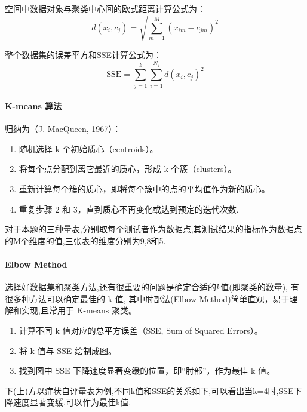 \documentclass[withoutpreface,bwprint]{cumcmthesis} %
\begin{document}
空间中数据对象与聚类中心间的欧式距离计算公式为：
\begin{equation}
    d(x_i, c_j) = \sqrt{\sum_{m=1}^M (x_{im} - c_{jm})^2}
\end{equation}

整个数据集的误差平方和SSE计算公式为：
\begin{equation}
\text{SSE} = \sum_{j=1}^k \sum_{i=1}^{N_j} d(x_i, c_j)^2
\end{equation}
    

\paragraph*{K-means 算法}归纳为（J. MacQueen, 1967）\cite{k-means}：
\begin{enumerate}
    \item 随机选择 k 个初始质心（centroids）。
    
    \item 将每个点分配到离它最近的质心，形成 k 个簇（clusters）。
    
    \item 重新计算每个簇的质心，即将每个簇中的点的平均值作为新的质心。
    
    \item 重复步骤 2 和 3，直到质心不再变化或达到预定的迭代次数.

\end{enumerate}

对于本题的三种量表,分别取每个测试者作为数据点,其测试结果的指标作为数据点的M个维度的值,三张表的维度分别为9,8和5.


\paragraph*{Elbow Method}选择好数据集和聚类方法,还有很重要的问题是确定合适的$k$值(即聚类的数量),
有很多种方法可以确定最佳的 k 值, 其中肘部法(Elbow Method)简单直观，易于理解和实现,且常用于 K-means 聚类。
\begin{enumerate}
    \item 计算不同 k 值对应的总平方误差（SSE, Sum of Squared Errors）。
    
    \item 将 k 值与 SSE 绘制成图。

    \item 找到图中 SSE 下降速度显著变缓的位置，即“肘部”，作为最佳 k 值。

\end{enumerate}
下(上)方以症状自评量表为例,不同k值和SSE的关系如下,可以看出当k=4时,SSE下降速度显著变缓,可以作为最佳k值.
\end{document}

